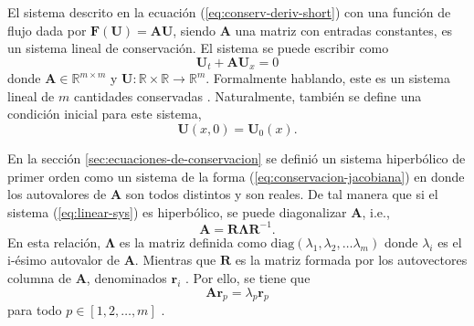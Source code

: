 El sistema descrito en la ecuación (\ref{eq:conserv-deriv-short}) con una función de flujo dada por $\mathbf{F}(\mathbf{U}) = \mathbf{A}\mathbf{U}$, siendo $\mathbf{A}$ una matriz con entradas constantes, es un sistema lineal de conservación. El sistema se puede escribir como
\begin{equation}
	\mathbf{U}_t + \mathbf{A}\mathbf{U}_x = 0
	\label{eq:linear-sys}
\end{equation}
donde $\mathbf{A} \in \mathbb{R}^{m \times m}$ y $\mathbf{U} : \mathbb{R} \times \mathbb{R} \rightarrow \mathbb{R}^{m}$. Formalmente hablando, este es un sistema lineal de $m$ cantidades conservadas \cite{Leveque}. Naturalmente, también se define una condición inicial para este sistema,
\begin{equation}
	\mathbf{U}(x,0) = \mathbf{U}_{0}(x).
	\label{eq:cond-inicial-linear-sys}
\end{equation}

En la sección \ref{sec:ecuaciones-de-conservacion} se definió un sistema hiperbólico de primer orden como un sistema de la forma (\ref{eq:conservacion-jacobiana}) en donde los autovalores de $\mathbf{A}$ son todos distintos y son reales. De tal manera que si el sistema (\ref{eq:linear-sys}) es hiperbólico, se puede diagonalizar $\mathbf{A}$, i.e.,
\begin{equation}
	\mathit{\mathbf{A}} = \mathbf{R}\mathbf{\Lambda} \mathbf{R}^{-1}.
	\label{eq:a-diago}
\end{equation}
En esta relación, $\mathbf{\Lambda}$ es la matriz definida como $\text{diag}(\lambda_1, \lambda_2, \dots \lambda_m)$ donde $\lambda_i$ es el i-ésimo autovalor de $\mathbf{A}$. Mientras que $\mathbf{R}$ es la matriz formada por los autovectores columna de $\mathbf{A}$, denominados $\mathbf{r}_i$ \cite{Leveque}. Por ello, se tiene que
\begin{equation}
	\mathbf{A}\mathbf{r}_{p}  = \lambda_{p} \mathbf{r}_{p} 
\end{equation}
para todo $p \in [1,2,\dots, m]$ \cite{Leveque}.

